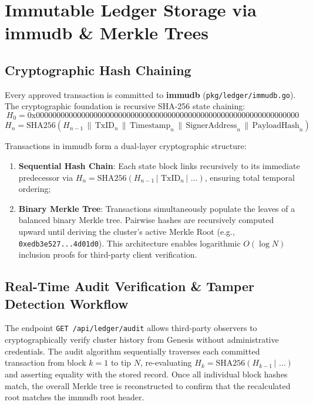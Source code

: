 \documentclass[a4paper,12pt]{article}
\begin{document}
\section{Immutable Ledger Storage via immudb \& Merkle Trees}

\subsection{Cryptographic Hash Chaining}

Every approved transaction is committed to \textbf{immudb} (\texttt{pkg/ledger/immudb.go}). The cryptographic foundation is recursive SHA-256 state chaining:
\begin{equation}
H_0 = \text{0x0000000000000000000000000000000000000000000000000000000000000000}
\end{equation}
\begin{equation}
H_n = \text{SHA256}(H_{n-1} \,\|\, \text{TxID}_n \,\|\, \text{Timestamp}_n \,\|\, \text{SignerAddress}_n \,\|\, \text{PayloadHash}_n)
\end{equation}

Transactions in immudb form a dual-layer cryptographic structure:
\begin{enumerate}[leftmargin=1.2cm]
    \item \textbf{Sequential Hash Chain}: Each state block links recursively to its immediate predecessor via $H_n = \text{SHA256}(H_{n-1} \,|\,\, \text{TxID}_n \,|\,\, \dots)$, ensuring total temporal ordering;
    \item \textbf{Binary Merkle Tree}: Transactions simultaneously populate the leaves of a balanced binary Merkle tree. Pairwise hashes are recursively computed upward until deriving the cluster's active Merkle Root (e.g., \texttt{0xedb3e527...4d01d0}). This architecture enables logarithmic $O(\log N)$ inclusion proofs for third-party client verification.
\end{enumerate}

\subsection{Real-Time Audit Verification \& Tamper Detection Workflow}

The endpoint \texttt{GET /api/ledger/audit} allows third-party observers to cryptographically verify cluster history from Genesis without administrative credentials. The audit algorithm sequentially traverses each committed transaction from block $k=1$ to tip $N$, re-evaluating $H_k = \text{SHA256}(H_{k-1} \,|\,\, \dots)$ and asserting equality with the stored record. Once all individual block hashes match, the overall Merkle tree is reconstructed to confirm that the recalculated root matches the immudb root header.
\end{document}
